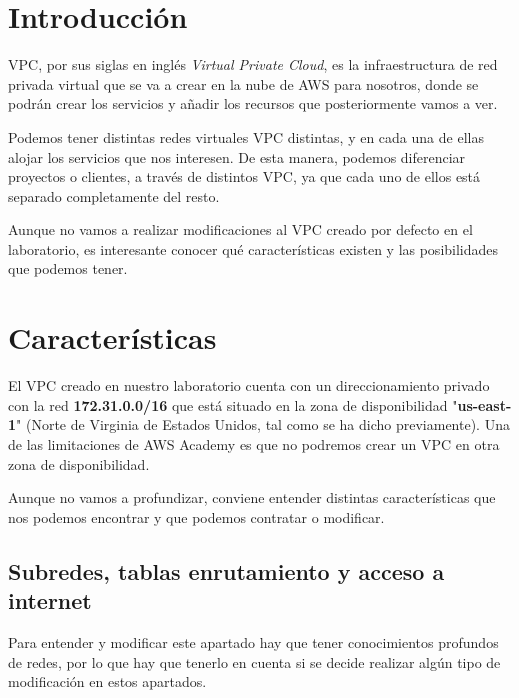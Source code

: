 \chapter{Introducción}

VPC, por sus siglas en inglés \textit{Virtual Private Cloud}, es la infraestructura de red privada virtual  que se va a crear en la nube de AWS para nosotros, donde se podrán crear los servicios y añadir los recursos que posteriormente vamos a ver.

Podemos tener distintas redes virtuales VPC distintas, y en cada una de ellas alojar los servicios que nos interesen. De esta manera, podemos diferenciar proyectos o clientes, a través de distintos VPC, ya que cada uno de ellos está separado completamente del resto.

Aunque no vamos a realizar modificaciones al VPC creado por defecto en el laboratorio, es interesante conocer qué características existen y las posibilidades que podemos tener.

\chapter{Características}

El VPC creado en nuestro laboratorio cuenta con un direccionamiento privado con la red \textbf{172.31.0.0/16} que está situado en la zona de disponibilidad "\textbf{us-east-1}" (Norte de Virginia de Estados Unidos, tal como se ha dicho previamente). Una de las limitaciones de AWS Academy es que no podremos crear un VPC en otra zona de disponibilidad.


Aunque no vamos a profundizar, conviene entender distintas características que nos podemos encontrar y que podemos contratar o modificar.


\section{Subredes, tablas enrutamiento y acceso a internet}

Para entender y modificar este apartado hay que tener conocimientos profundos de redes, por lo que hay que tenerlo en cuenta si se decide realizar algún tipo de modificación en estos apartados.

